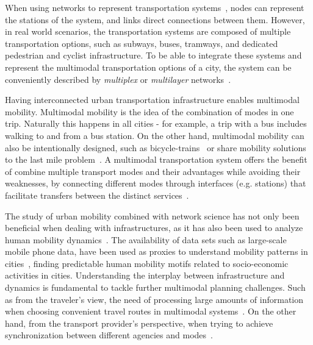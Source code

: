 When using networks to represent transportation systems~\cite{lin2013complex}, nodes can represent the stations of the system, and links direct connections between them. However, in real world scenarios, the transportation systems are composed of multiple transportation options, such as subways, buses, tramways, and dedicated pedestrian and cyclist infrastructure. To be able to integrate these systems and represent the multimodal transportation options of a city, the system can be conveniently described by \textit{multiplex} or \textit{multilayer} networks~\cite{dedomenico2013mathematical,kivela2014multilayer,boccaletti2014structure,battiston2014structural}.

Having interconnected urban transportation infrastructure enables multimodal mobility. Multimodal mobility is the idea of the combination of modes in one trip. Naturally this happens in all cities - for example, a trip with a bus includes walking to and from a bus station. On the other hand, multimodal mobility can also be intentionally designed, such as bicycle-trains~\cite{geurs2016multi} or share mobility solutions to the last mile problem~\cite{shaheen2016mobility}. A multimodal transportation system offers the benefit of combine multiple transport modes and their advantages while avoiding their weaknesses, by connecting different modes through interfaces (e.g. stations) that facilitate transfers between the distinct services~\cite{vannes2002design}.

The study of urban mobility combined with network science has not only been beneficial when dealing with infrastructures, as it has also been used to analyze human mobility dynamics~\cite{barbosa2018human}. The availability of data sets such as large-scale mobile phone data, have been used as proxies to understand mobility patterns in cities~\cite{gonzalez2008understanding}, finding predictable human mobility motifs related to socio-economic activities in cities. Understanding the interplay between infrastructure and dynamics is fundamental to tackle further multimodal planning challenges. Such as from the traveler's view, the need of processing large amounts of information when choosing convenient travel routes in multimodal systems~\cite{gallotti2016limits}. On the other hand, from the transport provider's perspective, when trying to achieve synchronization between different agencies and modes~\cite{barthelemy2016structure}.

